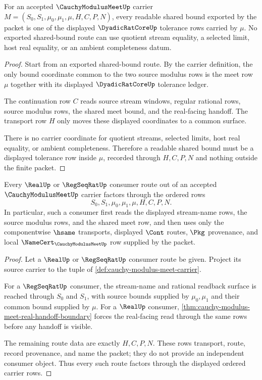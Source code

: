 \begin{theorem}\label{thm:cauchy-modulus-meet-shared-bound-exhaustion}
For an accepted $\CauchyModulusMeetUp$ carrier $M=(S_0,S_1,\mu_0,\mu_1,\mu,H,C,P,N)$, every readable shared bound exported by the packet is one of the displayed $\DyadicRatCoreUp$ tolerance rows carried by $\mu$. No exported shared-bound route can use quotient stream equality, a selected limit, host real equality, or an ambient completeness datum.
\end{theorem}
\begin{proof}
Start from an exported shared-bound route. By the carrier definition, the only bound coordinate common to the two source modulus rows is the meet row $\mu$ together with its displayed $\DyadicRatCoreUp$ tolerance ledger.

The continuation row $C$ reads source stream windows, regular rational rows, source modulus rows, the shared meet bound, and the real-facing handoff. The transport row $H$ only moves these displayed coordinates to a common surface.

There is no carrier coordinate for quotient streams, selected limits, host real equality, or ambient completeness. Therefore a readable shared bound must be a displayed tolerance row inside $\mu$, recorded through $H,C,P,N$ and nothing outside the finite packet.
\end{proof}

\begin{theorem}\label{thm:cauchy-modulus-meet-consumer-factorization}
Every $\RealUp$ or $\RegSeqRatUp$ consumer route out of an accepted $\CauchyModulusMeetUp$ carrier factors through the ordered rows
$$
S_0,S_1,\mu_0,\mu_1,\mu,H,C,P,N.
$$
In particular, such a consumer first reads the displayed stream-name rows, the source modulus rows, and the shared meet row, and then uses only the componentwise $\hsame$ transports, displayed $\Cont$ routes, $\Pkg$ provenance, and local $\NameCert_{\CauchyModulusMeetUp}$ row supplied by the packet.
\end{theorem}
\begin{proof}
Let a $\RealUp$ or $\RegSeqRatUp$ consumer route be given. Project its source carrier to the tuple of \autoref{def:cauchy-modulus-meet-carrier}.

For a $\RegSeqRatUp$ consumer, the stream-name and rational readback surface is reached through $S_0$ and $S_1$, with source bounds supplied by $\mu_0,\mu_1$ and their common bound supplied by $\mu$. For a $\RealUp$ consumer, \autoref{thm:cauchy-modulus-meet-real-handoff-boundary} forces the real-facing read through the same rows before any handoff is visible.

The remaining route data are exactly $H,C,P,N$. These rows transport, route, record provenance, and name the packet; they do not provide an independent consumer object. Thus every such route factors through the displayed ordered carrier rows.
\end{proof}

